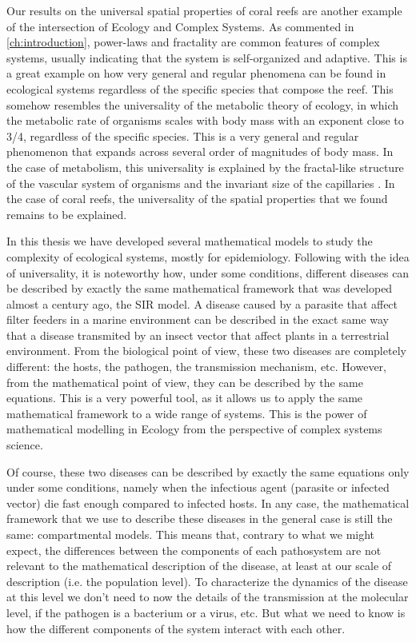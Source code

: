 Our results on the universal spatial properties of coral reefs are another
example of the intersection of Ecology and Complex Systems. As commented in
\cref{ch:introduction}, power-laws and fractality are common features of
complex systems, usually indicating that the system is self-organized and
adaptive. This is a great example on how very general and regular phenomena can
be found in ecological systems regardless of the specific species that compose
the reef. This somehow resembles the universality of the metabolic theory of
ecology, in which the metabolic rate of organisms scales with body mass with
an exponent close to 3/4, regardless of the specific species. This is a very
general and regular phenomenon that expands across several order of magnitudes
of body mass. In the case of metabolism, this universality is explained by the
fractal-like structure of the vascular system of organisms and the invariant
size of the capillaries \cite{West1997}. In the case of coral reefs, the
universality of the spatial properties that we found remains to be explained.


In this thesis we have developed several mathematical models to study the
complexity of ecological systems, mostly for epidemiology. Following with the
idea of universality, it is noteworthy how, under some conditions, different
diseases can be described by exactly the same mathematical framework that was
developed almost a century ago, the SIR model. A disease caused by a parasite
that affect filter feeders in a marine environment can be described in the
exact same way that a disease transmited by an insect vector that affect plants
in a terrestrial environment. From the biological point of view, these two
diseases are completely different: the hosts, the pathogen, the transmission
mechanism, etc. However, from the mathematical point of view, they can be
described by the same equations. This is a very powerful tool, as it allows us
to apply the same mathematical framework to a wide range of systems. This is
the power of mathematical modelling in Ecology from the perspective of complex
systems science.

Of course, these two diseases can be described by exactly the same equations
only under some conditions, namely when the infectious agent (parasite or
infected vector) die fast enough compared to infected hosts. In any case, the
mathematical framework that we use to describe these diseases in the general
case is still the same: compartmental models. This means that, contrary to what
we might expect, the differences between the components of each pathosystem are
not relevant to the mathematical description of the disease, at least at our
scale of description (i.e. the population level). To characterize the dynamics
of the disease at this level we don't need to now the details of the
transmission at the molecular level, if the pathogen is a bacterium or a virus,
etc. But what we need to know is how the different components of the system
interact with each other.

